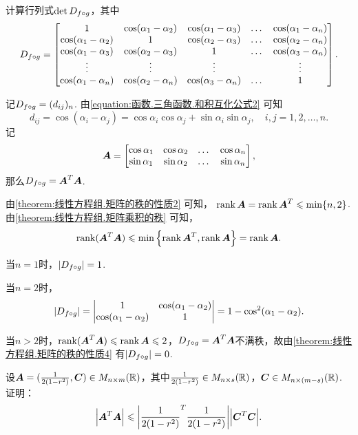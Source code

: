 \begin{example}
计算行列式\(\det D_{f \circ g}\)，其中\[
D_{f \circ g} = \begin{bmatrix}
1 & \cos(\alpha_1-\alpha_2) & \cos(\alpha_1-\alpha_3) & \dots & \cos(\alpha_1-\alpha_n) \\
\cos(\alpha_1-\alpha_2) & 1 & \cos(\alpha_2-\alpha_3) & \dots & \cos(\alpha_2-\alpha_n) \\
\cos(\alpha_1-\alpha_3) & \cos(\alpha_2-\alpha_3) & 1 & \dots & \cos(\alpha_3-\alpha_n) \\
\vdots & \vdots & \vdots & & \vdots \\
\cos(\alpha_1-\alpha_n) & \cos(\alpha_2-\alpha_n) & \cos(\alpha_3-\alpha_n) & \dots & 1
\end{bmatrix}.
\]
\begin{solution}
记\(D_{f \circ g} = (d_{ij})_n\).
由\cref{equation:函数.三角函数.和积互化公式2} 可知\[
d_{ij} = \cos(\alpha_i-\alpha_j)
= \cos\alpha_i\cos\alpha_j+\sin\alpha_i\sin\alpha_j,
\quad i,j=1,2,\dotsc,n.
\]记\[
\boldsymbol{A} = \begin{bmatrix}
\cos\alpha_1 & \cos\alpha_2 & \dots & \cos\alpha_n \\
\sin\alpha_1 & \sin\alpha_2 & \dots & \sin\alpha_n
\end{bmatrix},
\]那么\(D_{f \circ g} = \boldsymbol{A}^T \boldsymbol{A}\).

由\cref{theorem:线性方程组.矩阵的秩的性质2} 可知，%
\(\rank\boldsymbol{A} = \rank\boldsymbol{A}^T \leqslant \min\{n,2\}\).
由\cref{theorem:线性方程组.矩阵乘积的秩} 可知，\[
\rank(\boldsymbol{A}^T\boldsymbol{A}) \leqslant \min\left\{\rank\boldsymbol{A}^T,\rank\boldsymbol{A}\right\} = \rank\boldsymbol{A}.
\]

当\(n=1\)时，\(\abs{D_{f \circ g}}=1\).

当\(n=2\)时，\[
\abs{D_{f \circ g}} = \begin{vmatrix}
1 & \cos(\alpha_1-\alpha_2) \\
\cos(\alpha_1-\alpha_2) & 1
\end{vmatrix} = 1 - \cos^2(\alpha_1-\alpha_2).
\]

当\(n>2\)时，\(\rank(\boldsymbol{A}^T\boldsymbol{A}) \leqslant \rank\boldsymbol{A} \leqslant2\)，\(D_{f \circ g} = \boldsymbol{A}^T \boldsymbol{A}\)不满秩，故由\cref{theorem:线性方程组.矩阵的秩的性质4} 有\(\abs{D_{f \circ g}}=0\).
\end{solution}
\end{example}

\begin{example}
设\(\boldsymbol{A} = (\frac{1}{2(1-r^2)},\boldsymbol{C}) \in M_{n \times m}(\mathbb{R})\)，其中\(\frac{1}{2(1-r^2)} \in M_{n \times s}(\mathbb{R})\)，\(\boldsymbol{C} \in M_{n \times (m-s)}(\mathbb{R})\).
证明：\begin{equation}
\abs{\boldsymbol{A}^T \boldsymbol{A}} \leqslant \abs{\frac{1}{2(1-r^2)}^T \frac{1}{2(1-r^2)}} \abs{\boldsymbol{C}^T \boldsymbol{C}}.
\end{equation}
\end{example}

